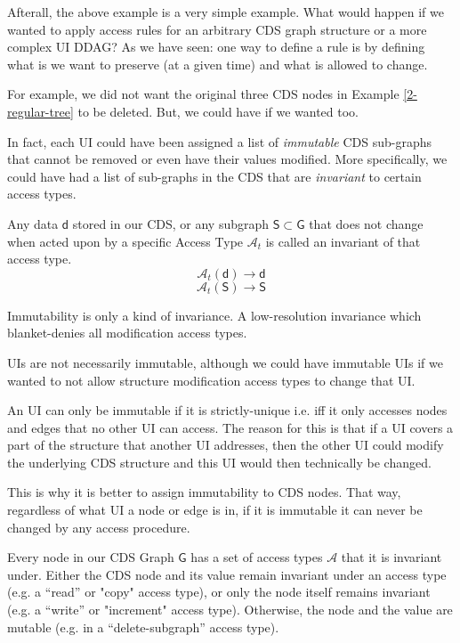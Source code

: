Afterall, the above example is a very simple example. What would happen if we wanted to apply access rules for an arbitrary CDS graph structure or a more complex UI DDAG? As we have seen: one way to define a rule is by defining what is we want to preserve (at a given time) and what is allowed to change.

For example, we did not want the original three CDS nodes in Example \ref{2-regular-tree} to be deleted. But, we could have if we wanted too.

In fact, each UI could have been assigned a list of \textit{immutable} CDS sub-graphs that cannot be removed or even have their values modified. More specifically, we could have had a list of sub-graphs in the CDS that are \textit{invariant} to certain access types.

\begin{con-def}[Invariants]
	\label{invariants}
	Any data $\mathsf{d}$ stored in our CDS, or any subgraph $\mathsf{S} \subset \mathsf{G}$ that does not change when acted upon by a specific Access Type $\mathcal{A}_{t}$ is called an invariant of that access type.
	\[ \mathcal{A}_{t}\mathsf{(d)} \rightarrow \mathsf{d} \]
	\[ \mathcal{A}_{t}\mathsf{(S)} \rightarrow \mathsf{S} \]
\end{con-def}

\begin{con-aside}
Immutability is only a kind of invariance. A low-resolution invariance which blanket-denies all modification access types.

UIs are not necessarily immutable, although we could have immutable UIs if we wanted to not allow structure modification access types to change that UI.

An UI can only be immutable if it is strictly-unique i.e. iff it only accesses nodes and edges that no other UI can access. The reason for this is that if a UI covers a part of the structure that another UI addresses, then the other UI could modify the underlying CDS structure and this UI would then technically be changed.

This is why it is better to assign immutability to CDS nodes. That way, regardless of what UI a node or edge is in, if it is immutable it can never be changed by any access procedure.
\end{con-aside}

Every node in our CDS Graph $\mathsf{G}$ has a set of access types $\mathcal{A}$ that it is invariant under. Either the CDS node and its value remain invariant under an access type (e.g. a ``read'' or "copy" access type), or only the node itself remains invariant (e.g. a ``write'' or "increment" access type). Otherwise, the node and the value are mutable (e.g. in a ``delete-subgraph'' access type).

